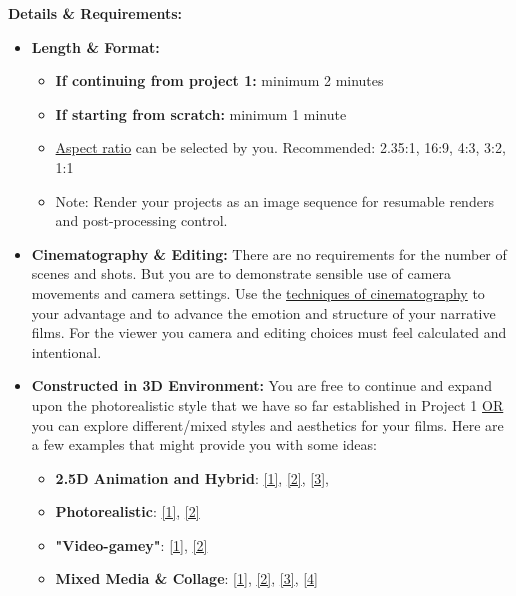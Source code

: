 \textbf{Details \& Requirements:}
\begin{itemize}
	\tightlist
	\item \textbf{Length \& Format:}
	      \begin{itemize}
		      \item \textbf{If continuing from project 1:} minimum 2 minutes
		      \item \textbf{If starting from scratch:} minimum 1 minute
		      \item \href{https://en.wikipedia.org/wiki/Aspect_ratio_(image)#/media/File:Filmaspectratios.svg}{Aspect ratio} can be selected by you. Recommended: 2.35:1, 16:9, 4:3, 3:2, 1:1
		      \item Note: Render your projects as an image sequence for resumable renders and post-processing control.
	      \end{itemize}
	\item \textbf{Cinematography \& Editing:} There are no requirements for the number of scenes and shots. But you are to demonstrate sensible use of camera movements and camera settings. Use the \href{https://www.studiobinder.com/blog/ultimate-guide-to-camera-shots/}{techniques of cinematography} to your advantage and to advance the emotion and structure of your narrative films. For the viewer you camera and editing choices must feel calculated and intentional.
	\item \textbf{Constructed in 3D Environment:} You are free to continue and expand upon the photorealistic style that we have so far established in Project 1 \ul{OR} you can explore different/mixed styles and aesthetics for your films. Here are a few examples that might provide you with some ideas:
	      \begin{itemize}
		      \item \textbf{2.5D Animation and Hybrid}: \href{https://www.youtube.com/watch?v=Cl_EhU7elyo}{[1]}, \href{https://www.youtube.com/watch?v=tobqZ8fMqBk}{[2]}, \href{https://www.youtube.com/watch?v=C8puJClvNYE}{[3]},
		      \item \textbf{Photorealistic}: \href{https://vimeo.com/297358261}{[1]}, \href{https://vimeo.com/385177134}{[2]}
		      \item \textbf{"Video-gamey"}: \href{https://www.youtube.com/watch?v=_GQWMnEskrY}{[1]}, \href{https://www.youtube.com/watch?v=8-ig_lnO7uU}{[2]}
		      \item \textbf{Mixed Media \& Collage}: \href{https://vimeo.com/167957360}{[1]}, \href{https://vimeo.com/hiradsab/outlier}{[2]}, \href{https://vimeo.com/203361631}{[3]}, \href{https://vimeo.com/181219125}{[4]}

\end{itemize}
\end{itemize}
